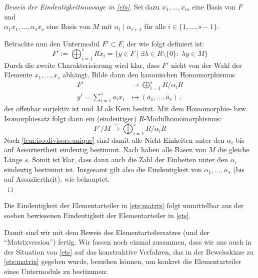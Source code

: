 \begin{proof}[Beweis der Eindeutigkeitsaussage in \cref{ets}]
    Sei dazu $x_1,\ldots,x_m$ eine Basis von $F$ und\\
    $\alpha_1 x_1,\ldots,\alpha_s x_s$ eine Basis von $M$ mit
    $\alpha_i\mid\alpha_{i+1}$ für alle $i\in\{1,\ldots,s-1\}$.
    
    Betrachte nun den Untermodul $F'\subset F$, der wie folgt definiert ist:
    \[ F' := \bigoplus_{i=1}^s Rx_i 
        = \bigl\{ y\in F \;\big\vert\; \exists \lambda\in R\setminus\!\{0\}\colon
        \; \lambda y \in M \bigr\}  \]
    Durch die zweite Charakterisierung wird klar, dass $F'$ nicht von der Wahl
    der Elemente $x_1,\ldots,x_s$ abhängt.
    Bilde dann den kanonischen Homomorphismus
    \begin{align*}
        F' &\to \bigoplus_{i=1}^s R/\alpha_i R      \\
        y' = \sum_{i=1}^s a_ix_i &\mapsto (\bar{a}_1,\ldots,\bar{a}_s) \,,
    \end{align*}
    der offenbar surjektiv ist und $M$ als Kern besitzt. 
    Mit dem Homomorphie- bzw. Isomorphiesatz \cite[5.2]{talk:markl}
    folgt dann ein (eindeutiger) $R$-Modulhomomorphismus:
    \[ F'/M \overset\sim\to \bigoplus_{i=1}^s R/\alpha_i R \]
    Nach \cref{lem:iso:divisors:unique}
    sind damit alle Nicht-Einheiten unter den $\alpha_i$ bis auf Assoziiertheit 
    eindeutig bestimmt. Nach \cite[3.6]{talk:stad}
    haben alle Basen von $M$ die gleiche Länge $s$. Somit ist klar, dass dann
    auch die Zahl der Einheiten unter den $\alpha_i$ eindeutig bestimmt ist.
    Insgesamt gilt also die Eindeutigkeit von $\alpha_1,\ldots,\alpha_s$ (bis
    auf Assoziiertheit), wie behauptet.
    \\
\end{proof}

\begin{thKorollar}
    Die Eindeutigkeit der Elementarteiler in \cref{ets:matrix}
    folgt unmittelbar aus der soeben bewiesenen Eindeutigkeit der
    Elementarteiler in \cref{ets}.
\end{thKorollar}

Damit sind wir mit dem Beweis des Elementarteilersatzes (und der
\enquote{Matrixversion}) fertig. Wir fassen noch einmal zusammen, dass wir uns
auch in der Situation von \cref{ets}
auf das konstruktive Verfahren, das in der Beweisskizze zu \cref{ets:matrix}
gegeben wurde, beziehen können, um konkret die Elementarteiler eines Untermoduls
zu bestimmen:

